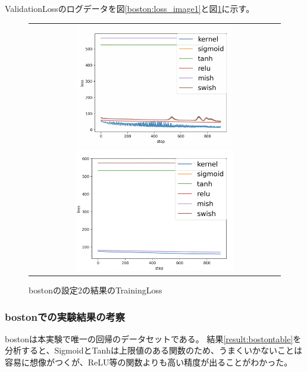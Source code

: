 ValidationLossのログデータを図\ref{boston:loss_image1}と図\ref{boston:loss_image2}に示す。

\begin{figure}[hbtp]
    \begin{center}
        \begin{tabular}{c}
            \begin{minipage}{0.5\hsize}
                \includegraphics[clip, width=7cm]{asset/boston_0.00001_1000_3_005_sgd_non_kaiming_uniform.png}
                    \caption{bostonの設定1の結果のTrainingLoss}
                    \label{boston:loss_image1}
                    
            \end{minipage}
            \hspace{10pt}
            \begin{minipage}{0.5\hsize}
                \includegraphics[clip, width=7cm]{asset/boston_0.00001_1000_3_005_sgd_non_xavier_uniform.png}
                    \caption{bostonの設定2の結果のTrainingLoss}
                    \label{boston:loss_image2}
            \end{minipage}
        \end{tabular}
    \end{center}
\end{figure}


\subsubsection{bostonでの実験結果の考察}
bostonは本実験で唯一の回帰のデータセットである。
結果\ref{result:bostontable}を分析すると、SigmoidとTanhは上限値のある関数のため、うまくいかないことは容易に想像がつくが、ReLU等の関数よりも高い精度が出ることがわかった。





